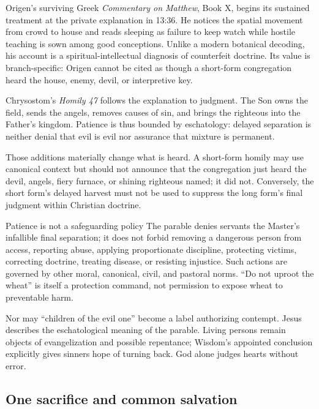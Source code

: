 \begin{deepstudy}
Origen's surviving Greek \emph{Commentary on Matthew}, Book X, begins its sustained treatment at the private explanation in 13:36. He notices the spatial movement from crowd to house and reads sleeping as failure to keep watch while hostile teaching is sown among good conceptions. Unlike a modern botanical decoding, his account is a spiritual-intellectual diagnosis of counterfeit doctrine. Its value is branch-specific: Origen cannot be cited as though a short-form congregation heard the house, enemy, devil, or interpretive key.

Chrysostom's \emph{Homily 47} follows the explanation to judgment. The Son owns the field, sends the angels, removes causes of sin, and brings the righteous into the Father's kingdom. Patience is thus bounded by eschatology: delayed separation is neither denial that evil is evil nor assurance that mixture is permanent.

Those additions materially change what is heard. A short-form homily may use canonical context but should not announce that the congregation just heard the devil, angels, fiery furnace, or shining righteous named; it did not. Conversely, the short form's delayed harvest must not be used to suppress the long form's final judgment within Christian doctrine.

\begin{studybox}{Patience is not a safeguarding policy}
The parable denies servants the Master's infallible final separation; it does not forbid removing a dangerous person from access, reporting abuse, applying proportionate discipline, protecting victims, correcting doctrine, treating disease, or resisting injustice. Such actions are governed by other moral, canonical, civil, and pastoral norms. “Do not uproot the wheat” is itself a protection command, not permission to expose wheat to preventable harm.
\end{studybox}

Nor may “children of the evil one” become a label authorizing contempt. Jesus describes the eschatological meaning of the parable. Living persons remain objects of evangelization and possible repentance; Wisdom's appointed conclusion explicitly gives sinners hope of turning back. God alone judges hearts without error.

\subsection*{One sacrifice and common salvation\enspace{}}


\end{deepstudy}
